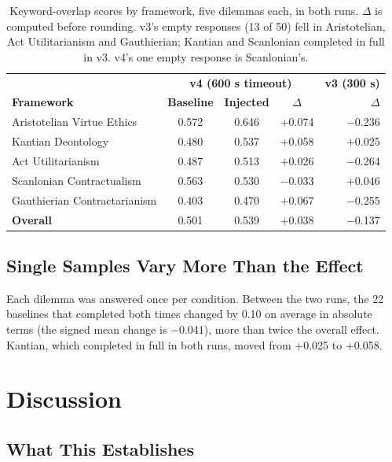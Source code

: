 \documentclass[11pt,a4paper]{article}
\begin{document}
\begin{table}[h]
\centering
\begin{tabular}{lcccr}
\toprule
 & \multicolumn{3}{c}{\textbf{v4 (600 s timeout)}} & \textbf{v3 (300 s)} \\
\textbf{Framework} & \textbf{Baseline} & \textbf{Injected} & \textbf{$\Delta$} & \textbf{$\Delta$} \\
\midrule
Aristotelian Virtue Ethics & 0.572 & 0.646 & $+$0.074 & $-$0.236 \\
Kantian Deontology & 0.480 & 0.537 & $+$0.058 & $+$0.025 \\
Act Utilitarianism & 0.487 & 0.513 & $+$0.026 & $-$0.264 \\
Scanlonian Contractualism & 0.563 & 0.530 & $-$0.033 & $+$0.046 \\
Gauthierian Contractarianism & 0.403 & 0.470 & $+$0.067 & $-$0.255 \\
\midrule
\textbf{Overall} & 0.501 & 0.539 & $+$0.038 & $-$0.137 \\
\bottomrule
\end{tabular}
\caption{Keyword-overlap scores by framework, five dilemmas each, in both runs. $\Delta$ is computed before rounding. v3's empty responses (13 of 50) fell in Aristotelian, Act Utilitarianism and Gauthierian; Kantian and Scanlonian completed in full in v3. v4's one empty response is Scanlonian's.}
\label{tab:results}
\end{table}
\FloatBarrier

\subsection{Single Samples Vary More Than the Effect}

Each dilemma was answered once per condition. Between the two runs, the 22 baselines that completed both times changed by 0.10 on average in absolute terms (the signed mean change is $-$0.041), more than twice the overall effect. Kantian, which completed in full in both runs, moved from $+$0.025 to $+$0.058.

\section{Discussion}

\subsection{What This Establishes}
\end{document}

